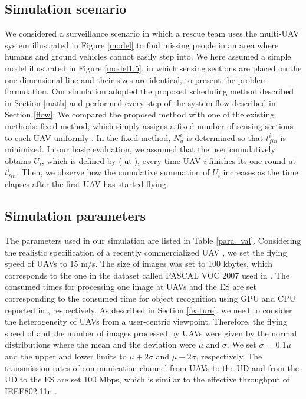 \documentclass{ieeeaccess}
\begin{document}
\subsection{Simulation scenario}
We considered a surveillance scenario in which a rescue team uses the multi-UAV system illustrated in Figure \ref{model} to find missing people in an area where humans and ground vehicles cannot easily step into.
%
We here assumed a simple model illustrated in Figure \ref{model1.5}, in which sensing sections are placed on the one-dimensional line and their sizes are identical, to present the problem formulation.
%
Our simulation adopted the proposed scheduling method described in Section \ref{math} and performed every step of the system flow described in Section \ref{flow}.
%
We compared the proposed method with one of the existing methods: fixed method, which simply assigns a fixed number of sensing sections to each UAV uniformly \cite{chang2016}.
In the fixed method, $N_u^i$ is determined so that $t_{fin}^i$ is minimized.
%
In our basic evaluation, we assumed that the user cumulatively obtains $U_i$, which is defined by (\ref{ut}), every time UAV $i$ finishes its one round at $t_{fin}^i$.
%
Then, we observe how the cumulative summation of $U_i$ increases as the time elapses after the first UAV has started flying.
%

\subsection{Simulation parameters}

The parameters used in our simulation are listed in Table \ref{para_val}.
%
Considering the realistic specification of a recently commercialized UAV \cite{bebop2}, we set the flying speed of UAVs to 15 m/s.
%
The size of images was set to 100 kbytes, which corresponds to the one in the dataset called PASCAL VOC 2007 used in \cite{Ren2015}.
%
The consumed times for processing one image at UAVs and the ES are set corresponding to the consumed time for object recognition using GPU and CPU reported in \cite{Ren2015}, respectively.
As described in Section \ref{feature}, we need to consider the heterogeneity of UAVs from a user-centric viewpoint.
Therefore, the flying speed of and the number of images processed by UAVs were given by the normal distributions where the mean and the deviation were $\mu$ and $\sigma$. We set $\sigma$ = 0.1$\mu$ and the upper and lower limits to $\mu+2\sigma$ and $\mu-2\sigma$, respectively.
%
The transmission rates of communication channel from UAVs to the UD and from the UD to the ES are set 100 Mbps, which is similar to the effective throughput of IEEE802.11n \cite{Li2013}.
%
\end{document}
